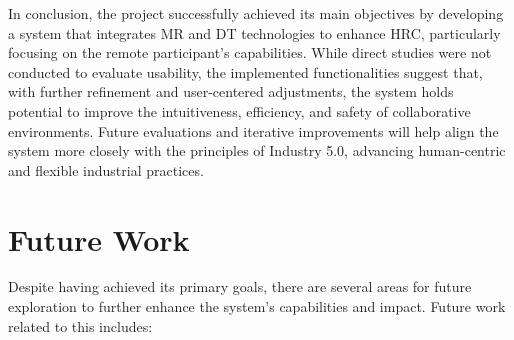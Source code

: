 In conclusion, the project successfully achieved its main objectives by developing a system that integrates \ac{MR} and \ac{DT} technologies to enhance \ac{HRC}, particularly focusing on the remote participant's capabilities. While direct studies were not conducted to evaluate usability, the implemented functionalities suggest that, with further refinement and user-centered adjustments, the system holds potential to improve the intuitiveness, efficiency, and safety of collaborative environments. Future evaluations and iterative improvements will help align the system more closely with the principles of Industry 5.0, advancing human-centric and flexible industrial practices.


\section{Future Work}

Despite having achieved its primary goals, there are several areas for future exploration to further enhance the system's capabilities and impact.
Future work related to this includes:

